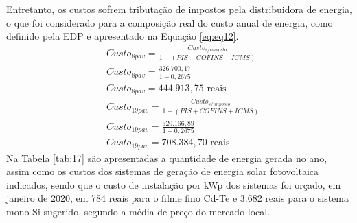 \noindent Entretanto, os custos sofrem tributação de impostos pela distribuidora de energia, o que foi considerado para a composição real do custo anual de energia, como definido pela EDP e apresentado na Equação \ref{eq:eq12}.
\begin{align}\label{eq:eq12}
    &Custo_{8pav}=\frac{Custo_{s/imposto}}{1-(PIS+COFINS+ICMS)} \nonumber \\
    &Custo_{8pav}=\frac{326.700,17}{1-0,2675}\nonumber \\
    &Custo_{8pav}=444.913,75 \text{ reais}\nonumber \\
    &Custo_{19pav}=\frac{Custo_{s/imposto}}{1-(PIS+COFINS+ICMS)} \nonumber \\
    &Custo_{19pav}=\frac{520.166,89}{1-0,2675}\nonumber \\ 
    &Custo_{19pav}=708.384,70 \text{ reais}
\end{align}
\noindent Na Tabela \ref{tab:17} são apresentadas a quantidade de energia gerada no ano, assim como os custos dos sistemas de geração de energia solar fotovoltaica indicados, sendo que o custo de instalação por kWp dos sistemas foi orçado, em janeiro de 2020, em 784 reais para o filme fino Cd-Te \cite{Sorgato2018} e 3.682 reais para o sistema mono-Si sugerido, segundo a média de preço do mercado local.\vspace*{-0.3cm}
